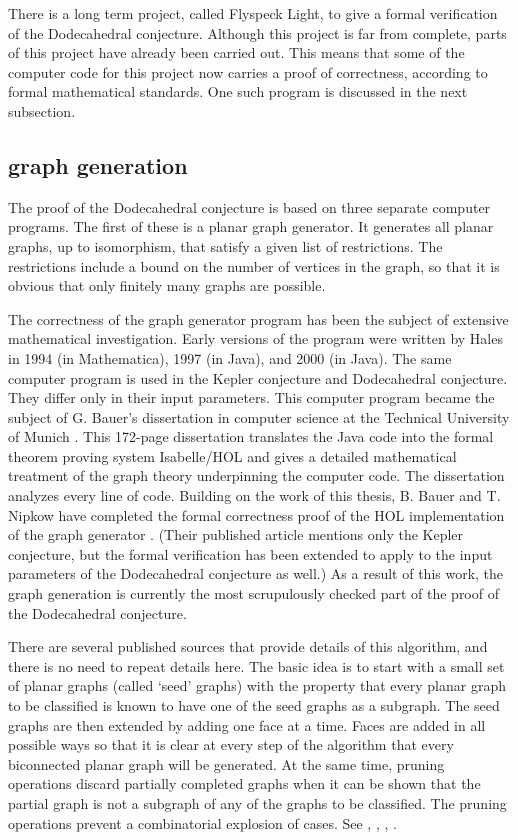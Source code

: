 \documentclass{article} %
\begin{document}
There is a long term project, 
called Flyspeck Light, to give a formal verification of the
Dodecahedral conjecture.  Although this project is far from
complete, parts of this project have already
been carried out.  This means that some of the computer code
for this project now carries a proof of correctness,
according to formal mathematical standards.  One such
program is discussed in the next subsection.




\subsection{graph generation}\label{sec:gg}

The proof of the Dodecahedral conjecture is based on three separate
computer programs.  The first of these is a planar graph generator.
It generates all planar graphs, up to isomorphism, that satisfy
a given list of restrictions.  The restrictions include a bound on
the number of vertices in the graph, so that it is obvious that only finitely many graphs are possible.

The correctness of the graph generator program has been the 
subject of extensive
mathematical investigation.  Early versions of the program were
written by Hales in 1994 (in Mathematica), 1997 (in Java), and 2000 (in Java).  The same computer program is used in the Kepler conjecture
and Dodecahedral conjecture.  They differ only in their input parameters.
This computer program became the subject of  G. Bauer's
dissertation in computer science at the Technical University of Munich
\cite{Bauer}.
This 172-page dissertation translates the Java code into the
formal theorem proving system Isabelle/HOL and gives a detailed 
mathematical treatment of the graph theory underpinning the
computer code.  The dissertation analyzes every line of code.  
Building on the work of this thesis, B. Bauer
and T. Nipkow have completed the formal correctness proof of the HOL implementation
of the graph generator \cite{BN06}.  (Their published article mentions
only the Kepler conjecture, but the formal verification 
has been extended to
apply to the input parameters of the Dodecahedral conjecture as well.)
As a result of this work, the graph generation is currently the
most scrupulously checked part of the proof of the Dodecahedral
conjecture.

There are several published sources that provide details of this
algorithm, and there is no need to repeat details here.   The basic idea is to start
with a small set of planar graphs  (called `seed' graphs) with
the property that every planar graph to be classified is known to have
one of the seed graphs as a subgraph.  The seed graphs are then
extended by adding one face at a time.  Faces are added in all
possible ways so that it is clear at every step of the algorithm
that every biconnected planar graph will be generated.  At the same time,
pruning operations discard partially completed graphs when it can
be shown that the partial graph is not a subgraph of any of the
graphs to be classified.  The pruning operations prevent a
combinatorial explosion of cases.
See \cite[\S5]{alg}, \cite[\S19]{DCG}, \cite{Bauer}, \cite{BN06}.
\end{document}
